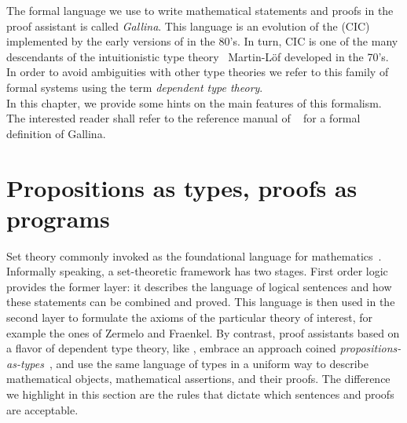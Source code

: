 The formal language we use to write
mathematical statements and proofs in the \Coq{} proof assistant
is called \emph{Gallina}.
This language is an evolution of the \emph{\mcbCIC{}}
(CIC)~\cite{coquand:huet:88,CoPa89} implemented
by the early versions of \Coq{} in the 80's. In turn, CIC is one of the many
descendants of the intuitionistic type theory~\cite{ITT} Martin-Löf developed in
the 70's. In order to avoid ambiguities with other type theories we refer to
this family of formal systems using the term \emph{dependent type theory}.\\
In this
chapter, we provide some hints on the main features of this
formalism. The interested reader shall refer to the reference manual
of \Coq{}~\cite{Coq:manual} for a formal definition of Gallina. %


\section{Propositions as types, proofs as programs}\label{sec:patpap}

Set theory commonly invoked as the foundational language for
mathematics~\cite{bourbaki-sets}. Informally speaking, a
set-theoretic framework has two stages. First order logic provides
the former layer: it describes the language of logical sentences and how
these statements can be combined and proved. This language is then
used in the second layer to formulate the axioms of the particular
theory of interest, for example the ones of Zermelo and Fraenkel.
By contrast, proof assistants based on a flavor of dependent
type theory, like \Coq{}, embrace an approach coined
\emph{propositions-as-types}~\cite{ch}, and use the same language of
types in a uniform way to describe mathematical objects, mathematical
assertions, and their proofs. 
The difference we highlight in this section are the rules that dictate
which sentences and proofs are acceptable.

